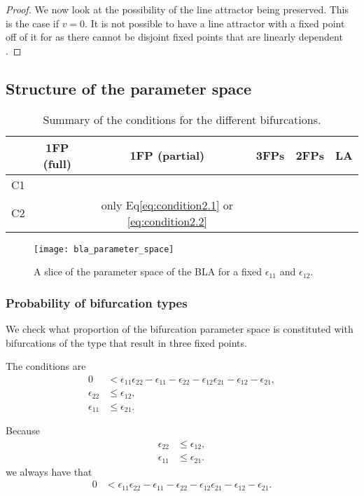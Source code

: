\documentclass{article} %
\newcounter{ct}
\newcommand{\cmark}{\ding{51}}%
\newcommand{\xmark}{\ding{55}}%
\theoremstyle{definition}
\theoremstyle{remark}
\begin{document}
\begin{proof}
We now look at the possibility of the line attractor being preserved. 
This is the case if $v=0$.
It is not possible to have a line attractor with a fixed point off of it for as there cannot be disjoint fixed points that are linearly dependent \citep[Lemma 5.2]{morrison2016a}.
\end{proof}

\subsection{Structure of the parameter space}
\begin{table}[H]
\caption{Summary of the conditions for the different bifurcations.}\label{tab:bifs}
\centering
\bgroup
\def\arraystretch{1.52}
\begin{tabular}{|c||c|c|c|c|c|}
\hline
& 1FP (full) 		& 1FP (partial) & 3FPs & 2FPs & LA  \\\hline \hline
C1 & \cmark	 	& \xmark 	 & \cmark & \xmark & \xmark \\\hline 
C2 & \xmark 		& only Eq\ref{eq:condition2.1} or \ref{eq:condition2.2}  	 & \cmark & \cmark& \xmark \\\hline 
\end{tabular}
\egroup
\end{table}

\begin{figure}[H]
  \centering
  \texttt{[image: bla\_parameter\_space]}
  \caption{A slice of the parameter space of the BLA for a fixed $\epsilon_{11}$ and $\epsilon_{12}$. %
  }
  \label{fig:blaparameterspace}
\end{figure}


\subsubsection{Probability of bifurcation types}
We check what proportion of the bifurcation parameter space is constituted with bifurcations of the type that result in three fixed points.

The conditions are 
\begin{align*}
0 &< \epsilon_{11}\epsilon_{22}-\epsilon_{11}-\epsilon_{22}-\epsilon_{12}\epsilon_{21}-\epsilon_{12}-\epsilon_{21},\\
\epsilon_{22} &\leq \epsilon_{12},\\
\epsilon_{11} &\leq \epsilon_{21}.
\end{align*}


Because
\begin{align*}
\epsilon_{22} &\leq \epsilon_{12},\\
\epsilon_{11} &\leq \epsilon_{21}.
\end{align*}
we always have that
\begin{align*}
0 &< \epsilon_{11}\epsilon_{22}-\epsilon_{11}-\epsilon_{22}-\epsilon_{12}\epsilon_{21}-\epsilon_{12}-\epsilon_{21}.
\end{align*}
\end{document}
